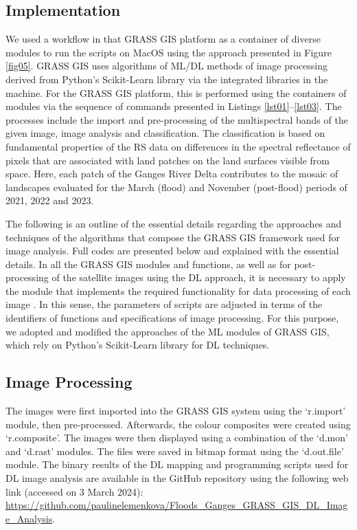 \documentclass[water,article,accept,pdftex,oneauhor]{Definitions/mdpi}
\begin{document}
\subsection{Implementation}
We used a workflow in that GRASS GIS platform as a container of diverse modules to run the scripts on MacOS using the approach presented in Figure \ref{fig05}. GRASS GIS uses algorithms of ML/DL methods of image processing derived from Python's Scikit-Learn library \cite{pedregosa2011scikit} via the integrated libraries in the machine. For the GRASS GIS platform, this is performed using the containers of modules via the sequence of commands presented in Listings \ref{lst01}--\ref{lst03}. The processes include the import and pre-processing of the multispectral bands of the given image, image analysis and classification{. The classification is based on fundamental properties of the RS data on }differences in the spectral reflectance {of pixels that are }associated with land patches {on the land surfaces visible from space. Here, }each{ }patch of the Ganges River Delta {contributes to the mosaic of }landscapes evaluated for the March (flood) and November (post-flood) periods of 2021, 2022 and 2023.

The following is an outline of the essential details regarding the approaches and techniques of the algorithms that compose the GRASS GIS framework {used} for image analysis. Full codes are presented below and explained with {the} essential details. In all the GRASS GIS modules and functions, as well as for post-processing of the satellite images using the DL approach, it is necessary to apply the module that {implements} the required functionality for data processing of each image%
{. In this sense, the parameters of scripts are adjusted }in terms of the identifiers of functions and {specifications} of image processing. For this purpose, we adopted and modified the approaches of the ML modules{ }of GRASS GIS, which rely on{ }Python's Scikit-Learn library for DL techniques.

\subsection{Image Processing}
The images were first imported into the GRASS GIS system using the `r.import' module{, then pre-processed. Afterwards, the }colour composites {were} created using `r.composite'. The images were then displayed using a combination of the `d.mon' and `d.rast' modules. The files {were} saved in bitmap format using the `d.out.file' module. The binary results of the DL mapping and programming scripts used for DL image analysis are available in the GitHub repository {using} the following web link (accessed on 3 March 2024): %
\url{https://github.com/paulinelemenkova/Floods\_Ganges\_GRASS\_GIS\_DL\_Image\_Analysis}.
\end{document}
